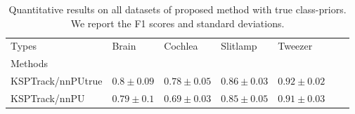\begin{table*}[t]
\centering
\caption{
    Quantitative results on all datasets of proposed method with true class-priors. We report the F1 scores and standard deviations.
    }
\label{tab:results_vs_true}
\begin{tabular}{llp{1.8cm}p{1.8cm}p{1.8cm}p{1.8cm}p{1.8cm}}
\toprule
Types &                Brain &               Cochlea &              Slitlamp &               Tweezer \\
Methods           &                      &                       &                       &                       \\
\midrule
KSPTrack/nnPUtrue &  $\bm{0.8} \pm 0.09$ &  $\bm{0.78} \pm 0.05$ &  $\bm{0.86} \pm 0.03$ &       $\bm{0.92} \pm 0.02$ \\
KSPTrack/nnPU     &       $0.79 \pm 0.1$ &       $0.69 \pm 0.03$ &       $0.85 \pm 0.05$ &  $0.91 \pm 0.03$ \\
\bottomrule
\end{tabular}
\end{table*}
